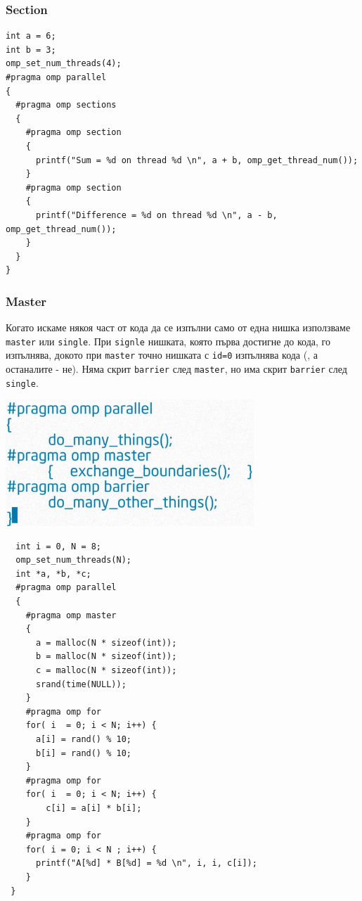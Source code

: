 \documentclass{beamer}
\begin{document}
\begin{frame}[fragile]
  \frametitle{Section}

\scriptsize
\lstset{language=C++}
\begin{lstlisting}
int a = 6;
int b = 3;
omp_set_num_threads(4);
#pragma omp parallel
{
  #pragma omp sections
  {
    #pragma omp section
    {
      printf("Sum = %d on thread %d \n", a + b, omp_get_thread_num());
    }
    #pragma omp section 
    {
      printf("Difference = %d on thread %d \n", a - b, omp_get_thread_num());
    }
  }
}
\end{lstlisting}

\end{frame}


\begin{frame}
  \frametitle{Master}

  Когато искаме някоя част от кода да се изпълни само от една нишка използваме \texttt{master} или \texttt{single}. При \texttt{signle} нишката, която първа достигне до кода, го изпълнява, докото при \texttt{master} точно нишката с \texttt{id=0} изпълнява кода (, а останалите - не). Няма скрит \texttt{barrier} след \texttt{master}, но има скрит \texttt{barrier} след \texttt{single}.

  \centering
  \includegraphics[width=0.7\textwidth]{master}
\end{frame}


\begin{frame}
 \scriptsize
\lstset{language=C++}
\begin{lstlisting}
  int i = 0, N = 8;
  omp_set_num_threads(N);
  int *a, *b, *c;
  #pragma omp parallel
  {
    #pragma omp master
    {
      a = malloc(N * sizeof(int));
      b = malloc(N * sizeof(int));
      c = malloc(N * sizeof(int));
      srand(time(NULL));
    }
    #pragma omp for
    for( i  = 0; i < N; i++) {
      a[i] = rand() % 10;  
      b[i] = rand() % 10;
    }
    #pragma omp for
    for( i  = 0; i < N; i++) {
        c[i] = a[i] * b[i];
    }
    #pragma omp for
    for( i = 0; i < N ; i++) {
      printf("A[%d] * B[%d] = %d \n", i, i, c[i]);
    }
 }
\end{lstlisting}
\end{frame}
\end{document}
